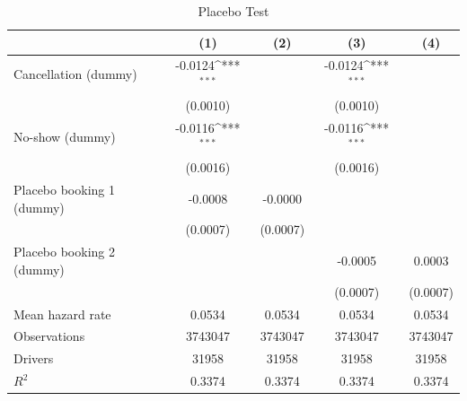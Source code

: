 \documentclass[reviewmode,AEJ]{AEA}
\begin{document}
\begin{table}[]
    \hfill


    \centering
    \footnotesize
    \caption{Placebo Test}
    \def\sym#1{\ifmmode^{#1}\else\(^{#1}\)\fi}
    \begin{tabularx}{\textwidth}{l@{\extracolsep{\fill}}*{4}{c}} 
        \toprule
        \toprule
                            &\multicolumn{1}{c}{(1)}         &\multicolumn{1}{c}{(2)}         &\multicolumn{1}{c}{(3)}         &\multicolumn{1}{c}{(4)}         \\
        \midrule
        Cancellation (dummy)&     -0.0124\sym{***}&                     &     -0.0124\sym{***}&                     \\
                            &    (0.0010)         &                     &    (0.0010)         &                     \\
        \addlinespace
        No-show (dummy)     &     -0.0116\sym{***}&                     &     -0.0116\sym{***}&                     \\
                            &    (0.0016)         &                     &    (0.0016)         &                     \\
        \addlinespace
        Placebo booking 1 (dummy)&     -0.0008         &     -0.0000         &                     &                     \\
                            &    (0.0007)         &    (0.0007)         &                     &                     \\
        \addlinespace
        Placebo booking 2 (dummy)&                     &                     &     -0.0005         &      0.0003         \\
                            &                     &                     &    (0.0007)         &    (0.0007)         \\
        \midrule
        Mean hazard rate    &      0.0534         &      0.0534         &       0.0534        &      0.0534         \\
        Observations        &     \num{3743047}   &     \num{3743047}   &     \num{3743047}   &     \num{3743047}   \\
        Drivers             &     \num{31958}     &      \num{31958}    &       \num{31958}   &       \num{31958}         \\
        \(R^2\)             &      0.3374         &      0.3374         &      0.3374         &      0.3374         \\
        \bottomrule

\end{tabularx}
\end{table}
\end{document}
